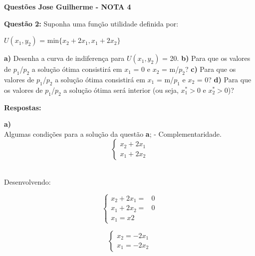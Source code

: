 \documentclass[a4paper, 12pt]{article} %
\begin{document}
\begin{flushleft}
\textbf{Questões Jose Guilherme - NOTA 4}
\singlespacing

\textbf{Questão 2:} Suponha uma função utilidade definida por:

\begin{center}
	$U(x_{1}, y_{2})$ = min$\lbrace{x_{2} + 2x_{1},x_{1} + 2x_{2} }\rbrace$

\end{center}

\textbf{a)} Desenha a curva de indiferença para $U(x_{1}, y_{2})$ = 20.
\singlespacing
\textbf{b)} Para que os valores de $p_{1}$/$p_{2}$ a solução ótima consistirá em $x_{1}$ = 0 e $x_{2}$ = m/$p_{2}$?
\singlespacing
\textbf{c)} Para que os valores de $p_{1}$/$p_{2}$ a solução ótima consistirá em $x_{1}$ = m/$p_{1}$ e $x_{2}$ = 0? 
\singlespacing
\textbf{d)} Para que os valores de $p_{1}$/$p_{2}$ a solução ótima será interior (ou seja, $x_{1}^{*} >0$ e $x_{2}^{*}>0$)?
\singlespacing

\textbf{Respostas:}
\singlespacing

\textbf{a)} \\
	Algumas condições para a solução da questão \textbf{a};
	 - Complementaridade.
	\singlespacing
	   \begin{equation} \label{eq:1}
		\left\{
		\begin{array}{ll}
		x_{2} + 2x_{1} \\
		x_{1} + 2x_{2}
		\end{array}
		\right.
		\end{equation}
\\
		\begin{center}
			Desenvolvendo:
		\end{center}


	\begin{equation}
	\left\{
	\begin{array}{ccc}
	x_{2} + 2x_{1} = & 0 \\
	x_{1} + 2x_{2} = & 0 \\
	x_{1} = x{2} 
	\end{array}
	\right.
	\end{equation}

	\begin{equation}
		\left\{
		\begin{array}{ll}
		x_{2} = - 2x_{1} \\
		x_{1} = - 2x_{2}
		\end{array}
		\right.
		\end{equation}\\


\end{flushleft}
\end{document}
